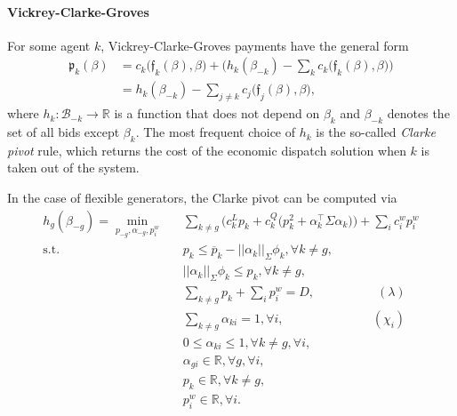 \documentclass{article}
\begin{document}
\paragraph{Vickrey-Clarke-Groves}

For some agent $k$, Vickrey-Clarke-Groves payments have the general form
\begin{align*}
\mathfrak{p}_k(\beta) &= c_k\big(\mathfrak{f}_k(\beta), \beta \big) + \Big(h_k(\beta_{-k}) - \sum_{k} c_k\big(\mathfrak{f}_k(\beta), \beta \big) \Big)\\
&= h_k(\beta_{-k}) - \sum_{j \ne k} c_j\big(\mathfrak{f}_j(\beta), \beta\big),
\end{align*}
where $h_k: \mathcal{B}_{-k} \rightarrow \mathbb{R}$ is a function that does not depend on $\beta_k$ and $\beta_{-k}$ denotes the set of all bids except $\beta_k$. The most frequent choice of $h_k$ is the so-called \textit{Clarke pivot} rule, which returns the cost of the economic dispatch solution when $k$ is taken out of the system.

In the case of flexible generators, the Clarke pivot can be computed via
\begin{align*}
h_g(\beta_{-g}) = \underset{p_{-g}, \alpha_{-g}, p_i^w}{\min} \hspace{10pt} & \sum_{k \ne g} \Big(c_k^L p_k+ c_k^Q \big(p_k ^2 + \alpha_k^\top \Sigma \alpha_k\big)\Big) + \sum_i c_i^w p_i^w \\
\mbox{s.t. } & p_k \le \overline{p}_k - ||\alpha_k||_{\Sigma} \phi_k,\forall k \ne g,\\
& ||\alpha_k||_{\Sigma} \phi_k \le p_k,\forall k \ne g,\\
& \sum_{k \ne g} p_k + \sum_i p_i^w = D, \hspace{60pt} (\lambda)\\
& \sum_{k \ne g} \alpha_{ki} = 1, \forall i, \hspace{85pt} (\chi_i)\\
& 0 \le \alpha_{ki} \le 1, \forall k \ne g, \forall i,\\
& \alpha_{gi} \in \mathbb{R}, \forall g, \forall i,\\
& p_k \in \mathbb{R}, \forall k \ne g,\\
& p_i^w \in \mathbb{R}, \forall i.
\end{align*}
\end{document}
